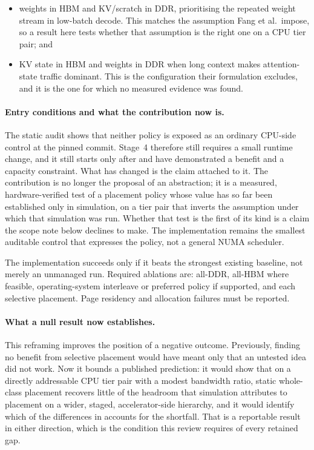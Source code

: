 \begin{itemize}
  \item weights in HBM and KV/scratch in DDR, prioritising the repeated
        weight stream in low-batch decode.  This matches the assumption
        Fang et al.\ impose, so a result here tests whether that
        assumption is the right one on a CPU tier pair; and
  \item KV state in HBM and weights in DDR when long context makes
        attention-state traffic dominant.  This is the configuration
        their formulation excludes, and it is the one for which no
        measured evidence was found.
\end{itemize}

\paragraph{Entry conditions and what the contribution now is.}
The static audit shows that neither policy is exposed as an ordinary
CPU-side \lcpp{} control at the pinned commit.  Stage~4 therefore still
requires a small runtime change, and it still starts only after
 and  have demonstrated a benefit and a
capacity constraint.  What has changed is the claim attached to it.  The
contribution is no longer the proposal of an abstraction; it is a
measured, hardware-verified test of a placement policy whose value has
so far been established only in simulation, on a tier pair that inverts
the assumption under which that simulation was run.  Whether that test
is the first of its kind is a claim the scope note below declines to
make.  The
implementation remains the smallest auditable control that expresses the
policy, not a general NUMA scheduler.

The implementation succeeds only if it beats the strongest existing
baseline, not merely an unmanaged run.  Required ablations are:
all-DDR, all-HBM where feasible, operating-system interleave or preferred
policy if supported, and each selective placement.  Page residency and
allocation failures must be reported.

\paragraph{What a null result now establishes.}
This reframing improves the position of a negative outcome.  Previously,
finding no benefit from selective placement would have meant only that
an untested idea did not work.  Now it bounds a published prediction:
it would show that on a directly addressable CPU tier pair with a
modest bandwidth ratio, static whole-class placement recovers little of
the headroom that simulation attributes to placement on a wider,
staged, accelerator-side hierarchy, and it would identify which of the
differences in  accounts for the shortfall.
That is a reportable result in either direction, which is the condition
this review requires of every retained gap.

